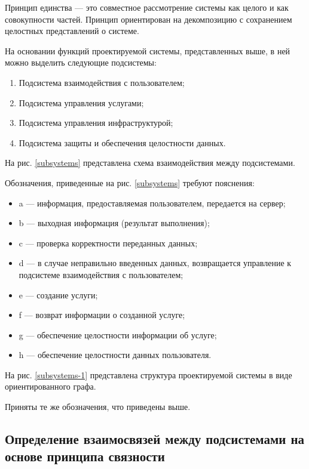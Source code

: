 Принцип единства --- это совместное рассмотрение системы как целого и как совокупности частей.
Принцип ориентирован на декомпозицию с сохранением целостных представлений о системе.

На основании функций проектируемой системы, представленных выше, в ней можно выделить следующие подсистемы:
\begin{enumerate}
  \item Подсистема взаимодействия с пользователем;
  \item Подсистема управления услугами;
  \item Подсистема управления инфраструктурой;
  \item Подсистема защиты и обеспечения целостности данных.
\end{enumerate}

На рис. \ref{subsystems} представлена схема взаимодействия между подсистемами.

Обозначения, приведенные на рис. \ref{subsystems} требуют пояснения:
\begin{itemize}[label={}]
  \item a --- информация, предоставляемая пользователем, передается на сервер;
  \item b --- выходная информация (результат выполнения);
  \item c --- проверка корректности переданных данных;
  \item d --- в случае неправильно введенных данных, возвращается управление к подсистеме взаимодействия с пользователем;
  \item e --- создание услуги;
  \item f --- возврат информации о созданной услуге;
  \item g --- обеспечение целостности информации об услуге;
  \item h --- обеспечение целостности данных пользователя.
\end{itemize}

На рис. \ref{subsystems-1} представлена структура проектируемой системы в виде ориентированного графа.

Приняты те же обозначения, что приведены выше.

\subsection{Определение взаимосвязей между подсистемами на основе принципа связности}

